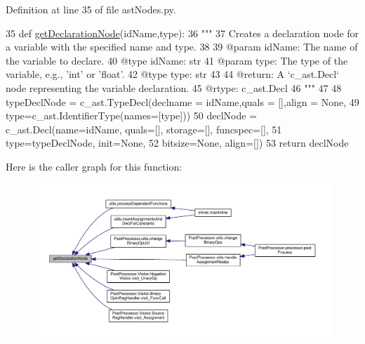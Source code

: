 Definition at line 35 of file ast\+Nodes.\+py.


\begin{DoxyCode}
35 \textcolor{keyword}{def }\hyperlink{namespacePostProcessor_1_1astNodes_aebd6602b5bdafed24833f298500fd85c}{getDeclarationNode}(idName,type):
36     \textcolor{stringliteral}{"""
}
37 \textcolor{stringliteral}{    Creates a declaration node for a variable with the specified name and type.
}
38 \textcolor{stringliteral}{
}
39 \textcolor{stringliteral}{    @param idName: The name of the variable to declare.
}
40 \textcolor{stringliteral}{    @type idName: str
}
41 \textcolor{stringliteral}{    @param type: The type of the variable, e.g., 'int' or 'float'.
}
42 \textcolor{stringliteral}{    @type type: str
}
43 \textcolor{stringliteral}{
}
44 \textcolor{stringliteral}{    @return: A `c\_ast.Decl` node representing the variable declaration.
}
45 \textcolor{stringliteral}{    @rtype: c\_ast.Decl
}
46 \textcolor{stringliteral}{    """}
47 
48     typeDeclNode = c\_ast.TypeDecl(declname = idName,quals = [],align = \textcolor{keywordtype}{None},
49                                                   type=c\_ast.IdentifierType(names=[type]))
50     declNode = c\_ast.Decl(name=idName, quals=[], storage=[], funcspec=[],
51                 type=typeDeclNode, init=\textcolor{keywordtype}{None},
52                 bitsize=\textcolor{keywordtype}{None}, align=[])
53     \textcolor{keywordflow}{return} declNode
\end{DoxyCode}
Here is the caller graph for this function\+:\nopagebreak
\begin{figure}[H]
\begin{center}
\leavevmode
\includegraphics[width=350pt]{namespaceastNodes_ae5e5c7f09a1586002b20db6d72f6d30b_icgraph}
\end{center}
\end{figure}
\mbox{\label{namespaceastNodes_a2403f5d006e54f20e614226280cb6cbc}} 
